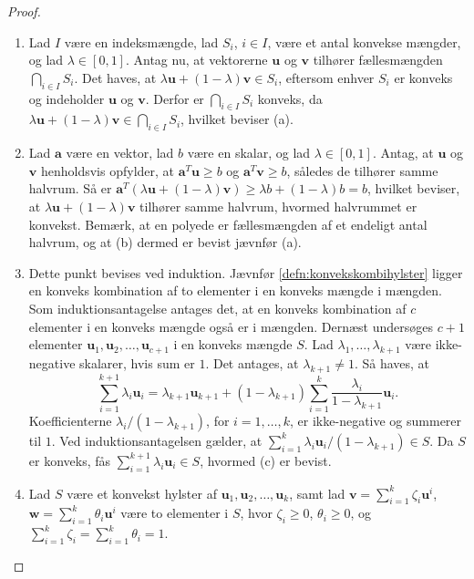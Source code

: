 %
%
\begin{proof}
\begin{enumerate}[label=(\alph*)]
	\item Lad $I$ være en indeksmængde, lad $S_i$, $i \in I$, være et antal konvekse mængder, og lad $ \lambda \in [0,1]$.
Antag nu, at vektorerne $\textbf{u}$ og $\textbf{v}$ tilhører fællesmængden $ \bigcap_{i \in I} S_i$. 
Det haves, at $ \lambda \textbf{u} + (1 - \lambda )\textbf{v} \in S_i$, eftersom enhver $S_i$ er konveks og  indeholder $\textbf{u}$ og $\textbf{v}$. Derfor er $ \bigcap_{i \in I} S_i$ konveks, da $ \lambda \textbf{u} + (1 - \lambda )\textbf{v} \in  \bigcap_{i \in I} S_i$, hvilket beviser (a). 
	\item Lad $\textbf{a}$ være en vektor, lad $b$ være en skalar, og lad $ \lambda \in [0,1]$. 
Antag, at $\textbf{u}$ og $\textbf{v}$ henholdsvis opfylder, at $\textbf{a}^T \textbf{u} \geq b$ og $\textbf{a}^T \textbf{v} \geq b$, således de tilhører samme halvrum. 
Så er $\textbf{a}^T (\lambda \textbf{u} + (1 - \lambda) \textbf{v} ) \geq \lambda b + (1 - \lambda ) b = b$, hvilket beviser, at $ \lambda \textbf{u} + (1 - \lambda )\textbf{v}$ tilhører samme halvrum, hvormed halvrummet er konvekst.
Bemærk, at en polyede er fællesmængden af et endeligt antal halvrum, og at (b) dermed er bevist jævnfør (a). 
	\item  Dette punkt bevises ved induktion.
Jævnfør \ref{defn:konvekskombihylster} ligger en konveks kombination af to elementer i en konveks mængde i mængden.
Som induktionsantagelse antages det, at en konveks kombination af $c$ elementer i en konveks mængde også er i mængden.
Dernæst undersøges $c+1$ elementer $\textbf{u}_1,\textbf{u}_2,\ldots,\textbf{u}_{c+1}$ i en konveks mængde $S$. 
Lad $\lambda_1,\ldots,\lambda_{k+1}$ være ikke-negative skalarer, hvis sum er $1$. 
Det antages, at $\lambda_{k+1}\neq1$. 
Så haves, at
$$\sum^{k+1}_{i=1}\lambda_i\textbf{u}_i=\lambda_{k+1}\textbf{u}_{k+1}+(1-\lambda_{k+1})\sum^{k}_{i=1}\dfrac{\lambda_i}{1-\lambda_{k+1}}\textbf{u}_i.$$
Koefficienterne $\lambda_i/(1-\lambda_{k+1})$, for $i=1,\ldots,k$, er ikke-negative og summerer til $1$. 
Ved induktionsantagelsen gælder, at $\sum^{k}_{i=1}\lambda_i\textbf{u}_i/(1-\lambda_{k+1})\in S$. 
Da $S$ er konveks, fås 
$\sum^{k+1}_{i=1}\lambda_i\textbf{u}_i\in S$, hvormed (c) er bevist. 
	\item Lad $S$ være et konvekst hylster af $\textbf{u}_1, \textbf{u}_2, \ldots, \textbf{u}_k$, samt lad $\textbf{v} = \sum_{i=1}^{k} \zeta_i \textbf{u}^i$, $\textbf{w} = \sum_{i=1}^{k} \theta_i \textbf{u}^i$ være to elementer i $S$, hvor $ \zeta_i \geq 0$, $ \theta_i \geq 0$, og $ \sum_{i=1}^{k} \zeta_i = \sum_{i=1}^{k} \theta_i = 1$. 

\end{enumerate}
\end{proof}
